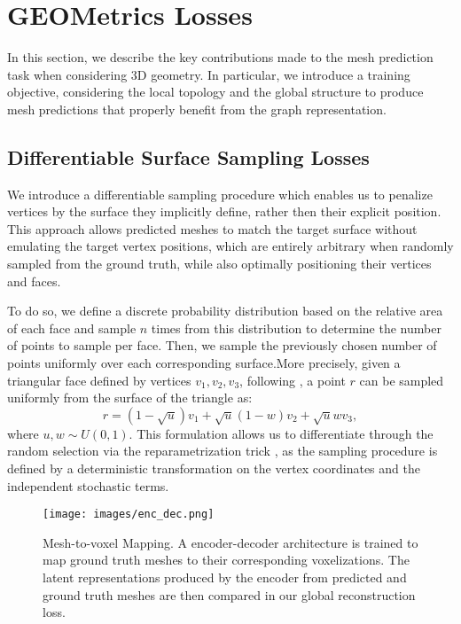 \documentclass{article}
\begin{document}
\section{GEOMetrics Losses}

In this section, we describe the key contributions made to the mesh prediction task when considering 3D geometry. In particular, we introduce a training objective, considering the local topology and the global structure to produce mesh predictions that properly benefit from the graph representation. 


\subsection{Differentiable Surface Sampling Losses}

We introduce a differentiable sampling procedure which enables us to penalize vertices by the surface they implicitly define, rather then their explicit position. This approach allows predicted meshes to match the target surface without emulating the target vertex positions, which are entirely arbitrary when randomly sampled from the ground truth, while also optimally positioning their vertices and faces. 

To do so, we define a discrete probability distribution based on the relative area of each face and sample $n$ times from this distribution to determine the number of points to sample per face. Then, we sample the previously chosen number of points uniformly over each corresponding surface.More precisely, given a triangular face defined by vertices $v_1, v_2, v_3$, following \citet{osada2002shape}, a point $r$ can be sampled uniformly from the surface of the triangle as:
\begin{equation}
r = (1-\sqrt u)v_1 + \sqrt u(1-w)v_2 + \sqrt{u}wv_3,
\end{equation}
where $u,w \sim U(0,1)$. This formulation allows us to differentiate through the random selection via the reparametrization trick \cite{kingma2013auto, rezende2014stochastic}, as the sampling procedure is defined by a deterministic transformation on the vertex coordinates and the independent stochastic terms.

\begin{figure} [t!]
\texttt{[image: images/enc\_dec.png]}
\centering
\caption{Mesh-to-voxel Mapping. A encoder-decoder architecture is trained to map ground truth meshes to their corresponding voxelizations. The latent representations produced by the encoder from predicted and ground truth meshes are then compared in our global reconstruction loss.} \label{fig:EncoderDecoder}
\end{figure}
\end{document}
